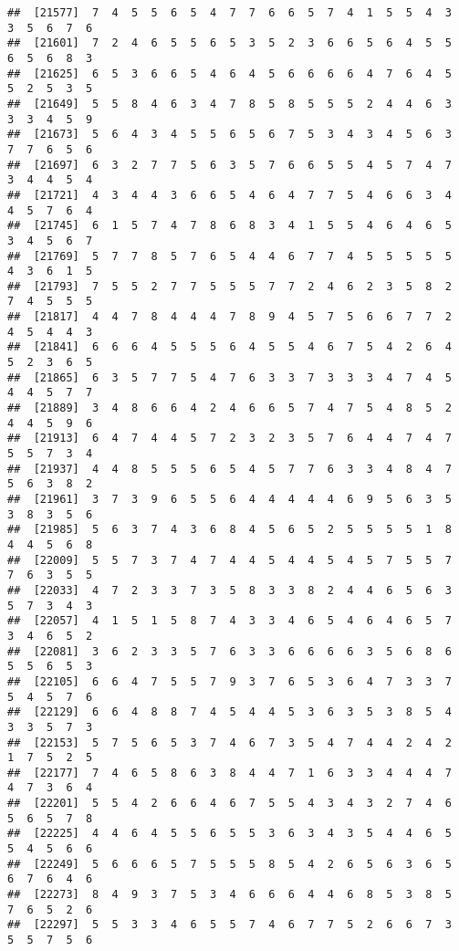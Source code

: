 \documentclass[
]{book}
\begin{document}
\begin{verbatim}
##  [21577]  7  4  5  5  6  5  4  7  7  6  6  5  7  4  1  5  5  4  3  3  5  6  7  6
##  [21601]  7  2  4  6  5  5  6  5  3  5  2  3  6  6  5  6  4  5  5  6  5  6  8  3
##  [21625]  6  5  3  6  6  5  4  6  4  5  6  6  6  6  4  7  6  4  5  5  2  5  3  5
##  [21649]  5  5  8  4  6  3  4  7  8  5  8  5  5  5  2  4  4  6  3  3  3  4  5  9
##  [21673]  5  6  4  3  4  5  5  6  5  6  7  5  3  4  3  4  5  6  3  7  7  6  5  6
##  [21697]  6  3  2  7  7  5  6  3  5  7  6  6  5  5  4  5  7  4  7  3  4  4  5  4
##  [21721]  4  3  4  4  3  6  6  5  4  6  4  7  7  5  4  6  6  3  4  4  5  7  6  4
##  [21745]  6  1  5  7  4  7  8  6  8  3  4  1  5  5  4  6  4  6  5  3  4  5  6  7
##  [21769]  5  7  7  8  5  7  6  5  4  4  6  7  7  4  5  5  5  5  5  4  3  6  1  5
##  [21793]  7  5  5  2  7  7  5  5  5  7  7  2  4  6  2  3  5  8  2  7  4  5  5  5
##  [21817]  4  4  7  8  4  4  4  7  8  9  4  5  7  5  6  6  7  7  2  4  5  4  4  3
##  [21841]  6  6  6  4  5  5  5  6  4  5  5  4  6  7  5  4  2  6  4  5  2  3  6  5
##  [21865]  6  3  5  7  7  5  4  7  6  3  3  7  3  3  3  4  7  4  5  4  4  5  7  7
##  [21889]  3  4  8  6  6  4  2  4  6  6  5  7  4  7  5  4  8  5  2  4  4  5  9  6
##  [21913]  6  4  7  4  4  5  7  2  3  2  3  5  7  6  4  4  7  4  7  5  5  7  3  4
##  [21937]  4  4  8  5  5  5  6  5  4  5  7  7  6  3  3  4  8  4  7  5  6  3  8  2
##  [21961]  3  7  3  9  6  5  5  6  4  4  4  4  4  6  9  5  6  3  5  3  8  3  5  6
##  [21985]  5  6  3  7  4  3  6  8  4  5  6  5  2  5  5  5  5  1  8  4  4  5  6  8
##  [22009]  5  5  7  3  7  4  7  4  4  5  4  4  5  4  5  7  5  5  7  7  6  3  5  5
##  [22033]  4  7  2  3  3  7  3  5  8  3  3  8  2  4  4  6  5  6  3  5  7  3  4  3
##  [22057]  4  1  5  1  5  8  7  4  3  3  4  6  5  4  6  4  6  5  7  3  4  6  5  2
##  [22081]  3  6  2  3  3  5  7  6  3  3  6  6  6  6  3  5  6  8  6  5  5  6  5  3
##  [22105]  6  6  4  7  5  5  7  9  3  7  6  5  3  6  4  7  3  3  7  5  4  5  7  6
##  [22129]  6  6  4  8  8  7  4  5  4  4  5  3  6  3  5  3  8  5  4  3  3  5  7  3
##  [22153]  5  7  5  6  5  3  7  4  6  7  3  5  4  7  4  4  2  4  2  1  7  5  2  5
##  [22177]  7  4  6  5  8  6  3  8  4  4  7  1  6  3  3  4  4  4  7  4  7  3  6  4
##  [22201]  5  5  4  2  6  6  4  6  7  5  5  4  3  4  3  2  7  4  6  5  6  5  7  8
##  [22225]  4  4  6  4  5  5  6  5  5  3  6  3  4  3  5  4  4  6  5  5  4  5  6  6
##  [22249]  5  6  6  6  5  7  5  5  5  8  5  4  2  6  5  6  3  6  5  6  7  6  4  6
##  [22273]  8  4  9  3  7  5  3  4  6  6  6  4  4  6  8  5  3  8  5  7  6  5  2  6
##  [22297]  5  5  3  3  4  6  5  5  7  4  6  7  7  5  2  6  6  7  3  5  5  7  5  6

\end{verbatim}
\end{document}
